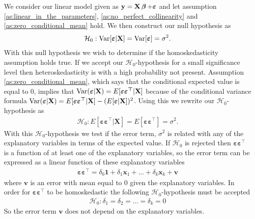 We consider our linear model given as $\textbf{y} = \textbf{X} \operatorname{\boldsymbol{\beta}} + \boldsymbol{\varepsilon}$ and let assumption \ref{as:linear_in_the_parameters}, \ref{as:no_perfect_collinearity} and \ref{as:zero_conditional_mean} hold. We then construct our null hypothesis as
\begin{align*}
    \mathcal{H}_0 : \operatorname{\text{Var}}[\boldsymbol{\varepsilon} | \mathbf{X}] = \operatorname{\text{Var}}[\boldsymbol{\varepsilon}] = \sigma^2. 
\end{align*}
With this null hypothesis we wish to determine if the homoskedasticity assumption holds true. 
If we accept our $\mathcal{H}_0$-hypothesis for a small significance level then heteroskedasticity is with a high probability not present.
Assumption \ref{as:zero_conditional_mean}, which says that the conditional expected value is equal to $0$, implies that $\operatorname{\text{Var}}(\boldsymbol{\varepsilon} | \mathbf{X}) = E[\boldsymbol{\varepsilon \varepsilon^\top} | \mathbf{X}]$ because of the conditional variance formula $\operatorname{\text{Var}}(\boldsymbol{\varepsilon} | \mathbf{X}) = E[\boldsymbol{\varepsilon \varepsilon^\top} | \mathbf{X}] - (E[\boldsymbol{\varepsilon} | \mathbf{X}])^2$. Using this we rewrite our $\mathcal{H}_0$-hypothesis as
\begin{align*}
    \mathcal{H}_0 : E[\boldsymbol{\varepsilon \varepsilon^\top} | \mathbf{X}] = E[\boldsymbol{\varepsilon \varepsilon^\top}] = \sigma^2.
\end{align*}
With this $\mathcal{H}_0$-hypothesis we test if the error term, $\sigma^2$ is related with any of the explanatory variables in terms of the expected value.  
If $\mathcal{H}_0$ is rejected then $\boldsymbol{\varepsilon \varepsilon^\top}$ is a function of at least one of the explanatory variables, so the error term can be expressed as a linear function of these explanatory variables
\begin{align}\label{eq:test_hetero_nul_hypotese}
    \boldsymbol{\varepsilon \varepsilon^\top} = \delta_0 \textbf{1} + \delta_1\textbf{x}_1 + \ldots + \delta_k\textbf{x}_k + \textbf{v}
\end{align}
where $\textbf{v}$ is an error with mean equal to $0$ given the explanatory variables. In order for $\boldsymbol{\varepsilon \varepsilon^\top}$ to be homoskedastic the following $\mathcal{H}_0$-hypothesis must be accepted 
\begin{align}\label{eq:H_nul_for_hetero_med_delta}
    \mathcal{H}_0 : \delta_1 = \delta_2 = \ldots = \delta_k = 0
\end{align}
So the error term $\textbf{v}$ does not depend on the explanatory variables. 
